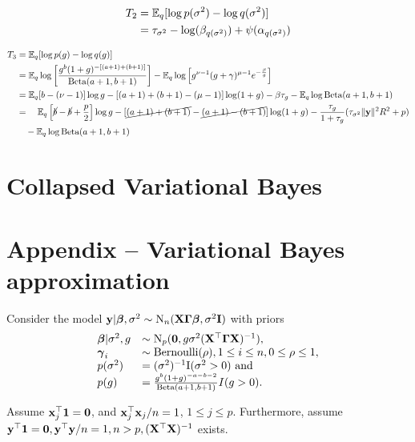 \documentclass{amsart}[12pt]
\begin{document}
\begin{align*}
T_2 &= \mathbb{E}_q [\log p(\sigma^2) - \log q(\sigma^2)] \\
&= \tau_{\sigma^2} - \log(\beta_{q(\sigma^2)}) + \psi(\alpha_{q(\sigma^2)})
\end{align*}

\begin{align*}
T_3 &= \mathbb{E}_q [\log p(g) - \log q(g)] \\
&= \mathbb{E}_q \log \left [ \frac{g^b (1 + g)^{-[(a + 1) + (b + 1)]}}{\text{Beta}(a + 1, b + 1)} \right ] -
	\mathbb{E}_q \log \left [ g^{\nu - 1} (g + \gamma)^{\mu - 1} e^{-\frac{\beta}{g}} \right ] \\
&= \mathbb{E}_q [b - (\nu - 1)] \log g - [(a + 1) + (b + 1) - (\mu - 1)] \log (1 + g) - \beta \tau_g
   - \mathbb{E}_q \log \text{Beta}(a + 1,  b + 1) \\
&= \quad \mathbb{E}_q \left [\cancel{b} - \cancel{b} + \frac{p}{2} \right ] \log g - [\cancel{(a + 1) + (b + 1)} - \cancel{(a + 1) - (b + 1)}] \log (1 + g)
    - \frac{\tau_g}{1 + \tau_g} (\tau_{\sigma^2} \|{\bf y}\|^2 R^2 + p)\\
&   \quad - \mathbb{E}_q \log \text{Beta}(a + 1,  b + 1) \\
\end{align*}

\section{Collapsed Variational Bayes}

\section{Appendix -- Variational Bayes approximation}

Consider the model ${\bf y} | {\boldsymbol \beta}, \sigma^2 \sim \text{N}_n({\bf X} {\boldsymbol \Gamma} {\boldsymbol \beta}, \sigma^2 {\bf I})$ with
priors
\begin{equation*}
\begin{array}{ll}
{\boldsymbol\beta} | \sigma^2, g &\sim \text{N}_p({\bf 0}, g \sigma^2({\bf X}^\top {\boldsymbol\Gamma} {\bf X})^{-1}), \\
{\boldsymbol \gamma}_i &\sim \text{Bernoulli}(\rho), 1 \leq i \leq n, 0 \leq \rho \leq 1, \\
p(\sigma^2) &= (\sigma^2)^{-1} \text{I}(\sigma^2 > 0) \text{ and }\\
p(g) &= \frac{g^b (1 + g)^{-a - b - 2}}{\text{Beta}(a + 1, b + 1)} I(g > 0).
\end{array}
\end{equation*}

Assume ${\bf x}_j^\top{\bf1} = {\bf 0}$, and ${\bf x}_j^\top {\bf x}_j / n = 1$, $1 \leq j \leq p$.
Furthermore, assume ${\bf y}^\top {\bf1} = {\bf 0}, {\bf y}^\top {\bf y} / n  = 1, n > p, ({\bf X}^\top {\bf X})^{-1}$ exists.
\end{document}
